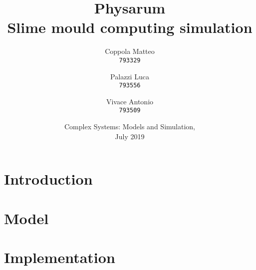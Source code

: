 \documentclass{report}
\begin{document}
\title{%
  \Huge Physarum\\
  \large Slime mould computing simulation\\
    }
\author{
  Coppola Matteo\\
  \texttt{793329}
  \and
  Palazzi Luca\\
  \texttt{793556}
   \and
  Vivace Antonio\\
  \texttt{793509}
}
\date{Complex Systems: Models and Simulation, \\ July 2019}
\maketitle


\tableofcontents

\chapter{Introduction}


\chapter{Model}


\chapter{Implementation}


\listoffigures



\end{document}
